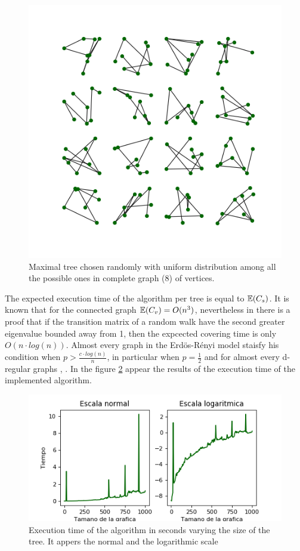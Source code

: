 \begin{figure}[h!]
	\centering
	\includegraphics[scale=0.8]{Python/Figures/Arboles8.png}
	\caption{Maximal tree chosen randomly with uniform distribution among all the possible ones in complete graph (8) of vertices.}	
	\label{fig:Arboles8}
\end{figure}

The expected execution time of the algorithm per tree is equal to $\mathbb{E}(C_{s})$. It is known that for the connected graph $\mathbb{E}(C_{v}) = O(n^{3})$, nevertheless in \cite{BS89} there is a proof that if the transition matrix of a random walk have the second greater eigenvalue bounded away from 1, then the expcected covering time is only $O(n\cdot log(n))$. Almost every graph in the Erdös-Rényi model staisfy his condition when $p > \frac{c\cdot log(n)}{n}$, in particular when $p=\frac{1}{2}$ and for almost every d-regular graphs \cite{BS87}, \cite{FKS89}. 
In the figure \ref{fig:tiemposGEN} appear the results of the execution time of the implemented algorithm.
\begin{figure}[h!]
	\centering
	\includegraphics[scale=0.8]{Python/Figures/Time-generate.png}
	\caption{ Execution time of the algorithm in seconds varying the size of the tree. It appers the normal and the logarithmic scale}
	\label{fig:tiemposGEN}
\end{figure}
